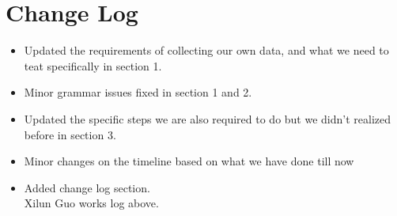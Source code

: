 \documentclass[10pt,draftclsnofoot,onecolumn,journal,compsoc]{IEEEtran}
\begin{document}
\section{Change Log}
\begin{itemize}
	\item Updated the requirements of collecting our own data, and what we need to teat specifically in section 1.
	\item Minor grammar issues fixed in section 1 and 2.
	\item Updated the specific steps we are also required to do but we didn't realized before in section 3.
	\item Minor changes on the timeline based on what we have done till now
	\item Added change log section.\\

Xilun Guo works log above.\\

\end{itemize}
\end{document}
